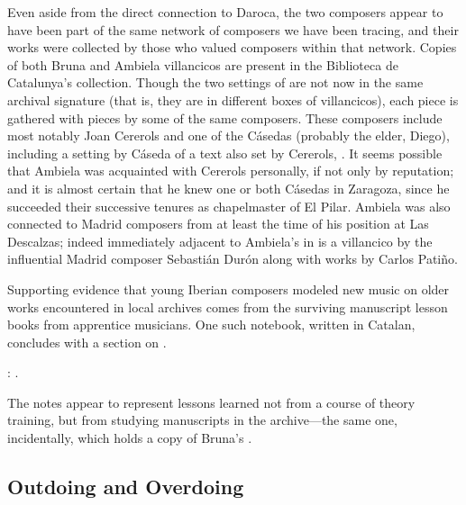 Even aside from the direct connection to Daroca, the two composers appear to
have been part of the same network of composers we have been tracing, and their
works were collected by those who valued composers within that network.  
Copies of both Bruna and Ambiela villancicos are present in the Biblioteca de
Catalunya's collection.
Though the two settings of  are not now in the same
archival signature (that is, they are in different boxes of villancicos), each
piece is gathered with pieces by some of the same composers.  
These composers include most notably Joan Cererols and one of the Cásedas
(probably the elder, Diego), including a setting by Cáseda of a text also set
by Cererols, . %
It seems possible that Ambiela was acquainted with Cererols personally, if not
only by reputation; and it is almost certain that he knew one or both Cásedas
in Zaragoza, since he succeeded their successive tenures as chapelmaster of El
Pilar.
Ambiela was also connected to Madrid composers from at least the time of
his position at Las Descalzas; indeed immediately adjacent to Ambiela's
 in  is a villancico by the
influential Madrid composer Sebastián Durón along with works by Carlos Patiño.

Supporting evidence that young Iberian composers modeled new music on older
works encountered in local archives comes from the surviving manuscript lesson
books from apprentice musicians.
One such notebook, written in Catalan, concludes with a section on .%
\begin{Footnote}
    : .
\end{Footnote}
The notes appear to represent lessons learned not from a course of theory
training, but from studying manuscripts in the archive---the same one,
incidentally, which holds a copy of Bruna's .

\subsection{Outdoing and Overdoing}

